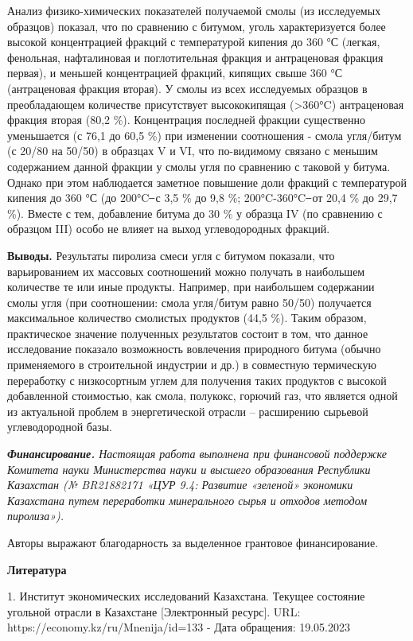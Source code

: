 Анализ физико-химических показателей получаемой смолы (из исследуемых
образцов) показал, что по сравнению с битумом, уголь характеризуется
более высокой концентрацией фракций с температурой кипения до 360 °С
(легкая, фенольная, нафталиновая и поглотительная фракция и антраценовая
фракция первая), и меньшей концентрацией фракций, кипящих свыше 360 °С
(антраценовая фракция вторая). У смолы из всех исследуемых образцов в
преобладающем количестве присутствует высококипящая (\textgreater360°C)
антраценовая фракция вторая (80,2 \%). Концентрация последней фракции
существенно уменьшается (с 76,1 до 60,5 \%) при изменении соотношения -
смола угля/битум (с 20/80 на 50/50) в образцах V и VI, что по-видимому
связано с меньшим содержанием данной фракции у смолы угля по сравнению с
таковой у битума. Однако при этом наблюдается заметное повышение доли
фракций с температурой кипения до 360 °С (до 200°C ̶ с 3,5 \% до 9,8 \%;
200°C-360°C ̶ от 20,4 \% до 29,7 \%). Вместе с тем, добавление битума до
30 \% у образца IV (по сравнению с образцом III) особо не влияет на
выход углеводородных фракций.

\textbf{Выводы.} Результаты пиролиза смеси угля с битумом показали, что
варьированием их массовых соотношений можно получать в наибольшем
количестве те или иные продукты. Например, при наибольшем содержании
смолы угля (при соотношении: смола угля/битум равно 50/50) получается
максимальное количество смолистых продуктов (44,5 \%). Таким образом,
практическое значение полученных результатов состоит в том, что данное
исследование показало возможность вовлечения природного битума (обычно
применяемого в строительной индустрии и др.) в совместную термическую
переработку с низкосортным углем для получения таких продуктов с высокой
добавленной стоимостью, как смола, полукокс, горючий газ, что является
одной из актуальной проблем в энергетической отрасли -- расширению
сырьевой углеводородной базы.

\emph{\textbf{Финансирование.} Настоящая работа выполнена при финансовой
поддержке Комитета науки Министерства науки и высшего образования
Республики Казахстан (№ BR21882171 «ЦУР 9.4: Развитие «зеленой»
экономики Казахстана путем переработки минерального сырья и отходов
методом пиролиза»).}

Авторы выражают благодарность за выделенное грантовое финансирование.

\textbf{Литература}

1. Институт экономических исследований Казахстана. Текущее состояние
угольной отрасли в Казахстане {[}Электронный ресурс{]}. URL:
https://economy.kz/ru/Mnenija/id=133 - Дата обращения: 19.05.2023

